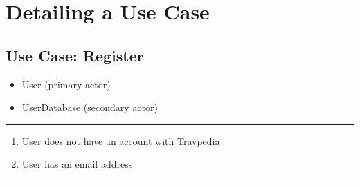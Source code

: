 \tablewidth

\hspace{-4.2cm}
\begin{minipage}[h][][s]{\linewidth}
	\section{Detailing a Use Case}
	\subsection{Use Case: Register}
\end{minipage}

\begin{itemize}
	\item User (primary actor)
	\item UserDatabase (secondary actor)
\end{itemize}
\noindent\rule{\textwidth}{0.6pt}

\begin{enumerate}
	\item User does not have an account with Travpedia
	\item User has an email address
\end{enumerate}
\noindent\rule{\textwidth}{0.6pt}

